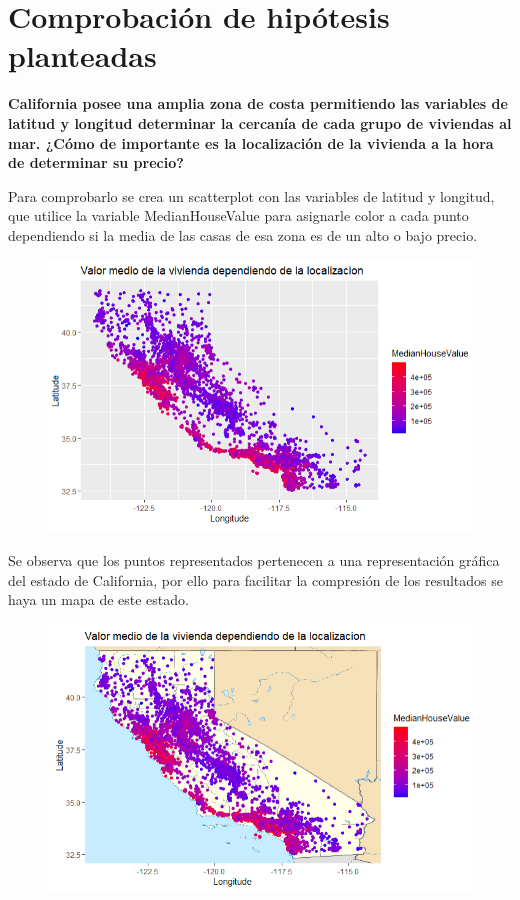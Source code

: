 \newpage
\section{Comprobación de hipótesis planteadas}
\textbf{California posee una amplia zona de costa permitiendo las variables de latitud y longitud determinar la cercanía de cada grupo de viviendas al mar. ¿Cómo de importante es la localización de la vivienda a la hora de determinar su precio?}

Para comprobarlo se crea un scatterplot con las variables de latitud y longitud, que utilice la variable MedianHouseValue para asignarle color a cada punto dependiendo si la media de las casas de esa zona es de un alto o bajo precio. 

\begin{figure}[h!]
	\centering
	\includegraphics[width=0.7\linewidth]{figures/hipo_1}
	\caption{}
	\label{fig:hipo1}
\end{figure}

Se observa que los puntos representados pertenecen a una representación gráfica del estado de California, por ello para facilitar la compresión de los resultados se haya un mapa de este estado.

\begin{figure}[h!]
	\centering
	\includegraphics[width=0.7\linewidth]{figures/hipo_2}
	\caption{}
	\label{fig:hipo2}
\end{figure}

